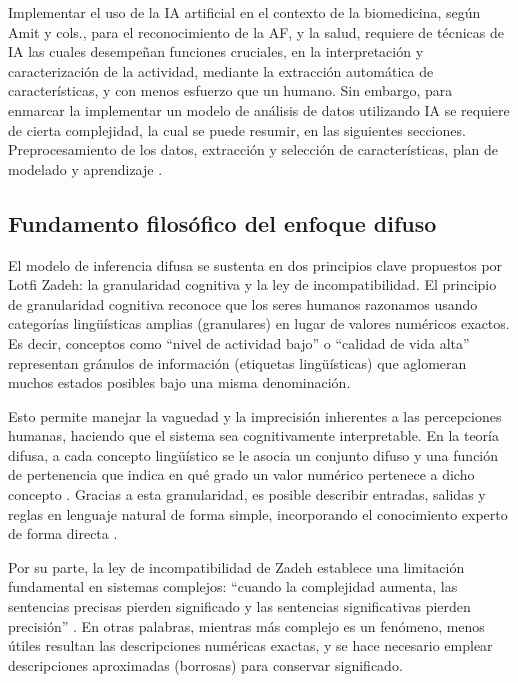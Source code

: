 Implementar el uso de la IA artificial en el contexto de la biomedicina, según Amit y cols., para el reconocimiento de la AF, y la salud, requiere de técnicas de IA las cuales desempeñan funciones cruciales, en la interpretación y caracterización de la actividad, mediante la extracción automática de características, y con menos esfuerzo que un humano. Sin embargo, para enmarcar la implementar un modelo de análisis de datos utilizando IA se requiere de cierta complejidad, la cual se puede resumir, en las siguientes secciones. Preprocesamiento de los datos, extracción y selección de características, plan de modelado y aprendizaje \citep{Amit2001Computational}.

\subsection{Fundamento filosófico del enfoque difuso}
\label{subsec:fundamento_filosofico_difuso}

El modelo de inferencia difusa se sustenta en dos principios clave propuestos por Lotfi Zadeh: la granularidad cognitiva y la ley de incompatibilidad. El principio de granularidad cognitiva reconoce que los seres humanos razonamos usando categorías lingüísticas amplias (granulares) en lugar de valores numéricos exactos. Es decir, conceptos como ``nivel de actividad bajo'' o ``calidad de vida alta'' representan gránulos de información (etiquetas lingüísticas) que aglomeran muchos estados posibles bajo una misma denominación.

Esto permite manejar la vaguedad y la imprecisión inherentes a las percepciones humanas, haciendo que el sistema sea cognitivamente interpretable. En la teoría difusa, a cada concepto lingüístico se le asocia un conjunto difuso y una función de pertenencia que indica en qué grado un valor numérico pertenece a dicho concepto \citep{Ross2010,Gupta2011Tribute}. Gracias a esta granularidad, es posible describir entradas, salidas y reglas en lenguaje natural de forma simple, incorporando el conocimiento experto de forma directa \citep{Gupta2011Tribute}.

Por su parte, la ley de incompatibilidad de Zadeh establece una limitación fundamental en sistemas complejos: ``cuando la complejidad aumenta, las sentencias precisas pierden significado y las sentencias significativas pierden precisión'' \citep{Levitz1979Logic}. En otras palabras, mientras más complejo es un fenómeno, menos útiles resultan las descripciones numéricas exactas, y se hace necesario emplear descripciones aproximadas (borrosas) para conservar significado.

